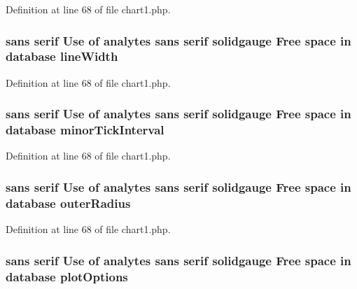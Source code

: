 Definition at line 68 of file chart1.\-php.

\hypertarget{chart1_8php_aca8aa21682b9d221fad19341399677d3}{
\subsubsection[{line\-Width}]{ sans serif Use of analytes sans serif solidgauge Free space in database line\-Width}}\label{chart1_8php_aca8aa21682b9d221fad19341399677d3}


Definition at line 68 of file chart1.\-php.

\hypertarget{chart1_8php_a9ffce19cd915b312ed0f797751927ae6}{
\subsubsection[{minor\-Tick\-Interval}]{ sans serif Use of analytes sans serif solidgauge Free space in database minor\-Tick\-Interval}}\label{chart1_8php_a9ffce19cd915b312ed0f797751927ae6}


Definition at line 68 of file chart1.\-php.

\hypertarget{chart1_8php_a41f34ec2811d09db7935316f9e4a98d6}{
\subsubsection[{outer\-Radius}]{ sans serif Use of analytes sans serif solidgauge Free space in database outer\-Radius}}\label{chart1_8php_a41f34ec2811d09db7935316f9e4a98d6}


Definition at line 68 of file chart1.\-php.

\hypertarget{chart1_8php_ad1521bbfde0c907436d0e34e1deecca2}{
\subsubsection[{plot\-Options}]{ sans serif Use of analytes sans serif solidgauge Free space in database plot\-Options}}\label{chart1_8php_ad1521bbfde0c907436d0e34e1deecca2}


